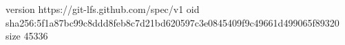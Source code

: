 version https://git-lfs.github.com/spec/v1
oid sha256:5f1a87bc99c8ddd8feb8c7d21bd620597c3e0845409f9c49661d499065f89320
size 45336
